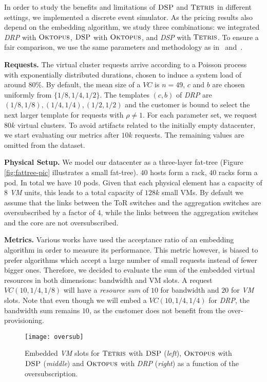 \documentclass{sig-alternate-per}
\newcommand{\ALG}{\textsc{Tetris}}
\newcommand{\OKTO}{\textsc{Oktopus}}
\newcommand{\pricing}{\textsc{DSP}}
\begin{document}
In order to study the benefits and limitations of $\pricing$ and $\ALG$ in different settings,
we implemented a discrete event simulator. As the pricing results also
depend on the embedding algorithm, we study three combinations:  we integrated \emph{DRP} with $\OKTO$, $\pricing$ with
$\OKTO$, and
\emph{\pricing} with $\ALG$. To ensure a fair comparison, we use the same parameters and methodology
as in~\cite{short-ballani2011towards} and~\cite{short-ballani2011price}.

\textbf{Requests.} The virtual cluster requests arrive according to a Poisson process with exponentially distributed
durations, chosen to induce a system load of around $80\%$. By default, the mean size of a $VC$ is $n = 49$, $c$ and $b$
are
chosen uniformly from $\{1/8,1/4,1/2\}$. The templates $(c,b)$ of \emph{DRP} are $(1/8,1/8), (1/4,1/4), (1/2,1/2)$ and the customer is
bound to select the next larger template for requests with $\rho\neq1$. For each parameter
set, we request $80k$ virtual clusters. To avoid artifacts related to the
initially empty datacenter, we start evaluating our metrics after $10k$ requests. The remaining values are omitted from
the dataset.

\textbf{Physical Setup.} We model our datacenter as a three-layer fat-tree (Figure \ref{fig:fattree-pic} illustrates a
small fat-tree). $40$ hosts form a rack, $40$ racks form a pod. In total we have $10$ pods. Given that each physical
element has a capacity of $8$  \emph{VM} units, this leads to a total capacity of $128k$ small VMs. By default we assume
that the links between the ToR switches and the aggregation switches are oversubscribed by a factor of $4$, while the
links between the aggregation switches and the core are not oversubscribed.

\textbf{Metrics.} Various works have used the acceptance ratio of an embedding algorithm in order to measure its
performance. This metric however, is biased to prefer algorithms which accept a large number of small requests instead
of fewer bigger ones. Therefore, we decided to evaluate the sum of the embedded virtual resources in both dimensions:
bandwidth and VM slots. A request $VC(10,1/4,1/8)$ will have a \emph{resource sum} of $10$ for bandwidth and $20$
for \emph{VM} slots. Note that even though we will embed a $VC(10,1/4,1/4)$ for \emph{DRP}, the bandwidth sum remains $10$,
as the customer does not benefit from the over-provisioning.

\begin{figure}[ht]
  \centering
\texttt{[image: oversub]}
      \caption{Embedded \emph{VM} slots for $\ALG$ with $\pricing$ (\emph{left}), $\OKTO$ with $\pricing$
(\emph{middle}) and $\OKTO$
with \emph{DRP} (\emph{right}) as a function of the oversubscription.}
      \label{fig:oversub}
  \end{figure}
\end{document}
